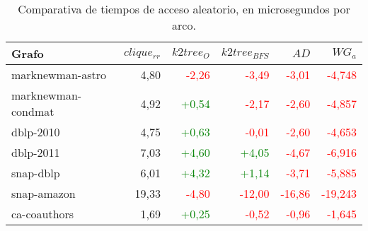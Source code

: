 \begin{table}
	\caption{Comparativa de tiempos de acceso aleatorio, en microsegundos por arco.}
	\label{table:timesRandomDiff}
	\centering
	\begin{tabular}{l|r|r|r|r|r}
		\toprule
		Grafo & $clique_{rr}$ & $k2tree_{O}$ & $k2tree_{BFS}$ & $AD$ & $WG_{a}$ \\
		\midrule	
		marknewman-astro & 4,80 & \textcolor{Red}{-2,26} & \textcolor{Red}{-3,49} & \textcolor{Red}{-3,01} & \textcolor{Red}{-4,748} \\
		marknewman-condmat & 4,92 & \textcolor{Green}{+0,54} & \textcolor{Red}{-2,17} & \textcolor{Red}{-2,60} & \textcolor{Red}{-4,857} \\
		dblp-2010 & 4,75 & \textcolor{Green}{+0,63} & \textcolor{Red}{-0,01} & \textcolor{Red}{-2,60} & \textcolor{Red}{-4,653} \\
		dblp-2011 & 7,03 & \textcolor{Green}{+4,60} & \textcolor{Green}{+4,05} & \textcolor{Red}{-4,67} & \textcolor{Red}{-6,916} \\
		snap-dblp & 6,01 & \textcolor{Green}{+4,32} & \textcolor{Green}{+1,14} & \textcolor{Red}{-3,71} & \textcolor{Red}{-5,885} \\
		snap-amazon & 19,33 & \textcolor{Red}{-4,80} & \textcolor{Red}{-12,00} & \textcolor{Red}{-16,86} & \textcolor{Red}{-19,243} \\
		ca-coauthors & 1,69 & \textcolor{Green}{+0,25} & \textcolor{Red}{-0,52} & \textcolor{Red}{-0,96} & \textcolor{Red}{-1,645} \\
        \bottomrule
	\end{tabular}
\end{table}
